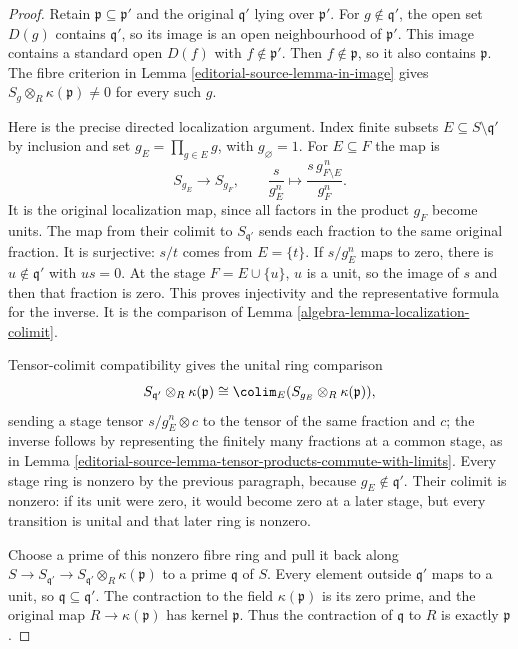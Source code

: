 \begin{proof}
Retain $\mathfrak p\subseteq\mathfrak p'$ and the original
$\mathfrak q'$ lying over $\mathfrak p'$.
For $g\notin\mathfrak q'$, the open set $D(g)$ contains
$\mathfrak q'$, so its image is an open neighbourhood of
$\mathfrak p'$. This image contains a standard open
$D(f)$ with $f\notin\mathfrak p'$. Then
$f\notin\mathfrak p$, so it also contains $\mathfrak p$.
The fibre criterion in Lemma \ref{editorial-source-lemma-in-image} gives
$S_g\otimes_R\kappa(\mathfrak p)\ne0$ for every such $g$.

Here is the precise directed localization argument. Index
finite subsets $E\subseteq S\setminus\mathfrak q'$ by
inclusion and set $g_E=\prod_{g\in E}g$, with $g_\varnothing=1$.
For $E\subseteq F$ the map is
$$
S_{g_E}\longrightarrow S_{g_F},\qquad
\frac{s}{g_E^n}\longmapsto
\frac{s\,g_{F\setminus E}^{\,n}}{g_F^n}.
$$
It is the original localization map, since all factors
in the product $g_F$ become units. The map from their
colimit to $S_{\mathfrak q'}$ sends each fraction to the
same original fraction. It is surjective: $s/t$ comes
from $E=\{t\}$. If $s/g_E^n$ maps to zero, there is
$u\notin\mathfrak q'$ with $us=0$. At the stage
$F=E\cup\{u\}$, $u$ is a unit, so the image of $s$
and then that fraction is zero. This proves injectivity
and the representative formula for the inverse. It is
the comparison of Lemma \ref{algebra-lemma-localization-colimit}.

Tensor-colimit compatibility gives the unital ring
comparison
$$
S_{\mathfrak q'}\otimes_R\kappa(\mathfrak p)
\cong\colim_E(S_{g_E}\otimes_R\kappa(\mathfrak p)),
$$
sending a stage tensor $s/g_E^n\otimes c$ to the tensor
of the same fraction and $c$; the inverse follows by
representing the finitely many fractions at a common
stage, as in Lemma \ref{editorial-source-lemma-tensor-products-commute-with-limits}.
Every stage ring is nonzero by the previous paragraph,
because $g_E\notin\mathfrak q'$. Their colimit is nonzero:
if its unit were zero, it would become zero at a later
stage, but every transition is unital and that later
ring is nonzero.

Choose a prime of this nonzero fibre ring and pull it
back along $S\to S_{\mathfrak q'}\to
S_{\mathfrak q'}\otimes_R\kappa(\mathfrak p)$ to a prime
$\mathfrak q$ of $S$. Every element outside
$\mathfrak q'$ maps to a unit, so
$\mathfrak q\subseteq\mathfrak q'$.
The contraction to the field $\kappa(\mathfrak p)$ is
its zero prime, and the original map $R\to\kappa(\mathfrak p)$
has kernel $\mathfrak p$. Thus the contraction of
$\mathfrak q$ to $R$ is exactly $\mathfrak p$.


\end{proof}
